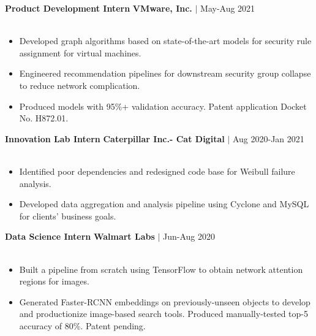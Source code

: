 \documentclass{cv}
\newcommand*{\labelfont}{\fontfamily{bch}\selectfont}
\begin{document}
{\labelfont \textbf{Product Development Intern} \hspace*{8.5cm} \textbf{VMware, Inc.} $|$ May-Aug 2021}\\
\vspace*{-25pt}\\
{
\small
\begin{itemize}
    \setlength\itemsep{-2.5pt}
    \item Developed graph algorithms based on state-of-the-art models for security rule assignment for virtual machines.
    \item Engineered recommendation pipelines for downstream security group collapse to reduce network complication.
    \item Produced models with 95\%+ validation accuracy. Patent application Docket No. H872.01.
\end{itemize}
}

{\labelfont \textbf{Innovation Lab Intern} \hspace*{6.5cm} \textbf{Caterpillar Inc.- Cat Digital} $|$ Aug 2020-Jan 2021}\\
\vspace*{-25pt}\\
{
\small
\begin{itemize}
    \setlength\itemsep{-2.5pt}
    \item Identified poor dependencies and redesigned code base for Weibull failure analysis.
    \item Developed data aggregation and analysis pipeline using Cyclone and MySQL for clients' business goals.
\end{itemize}
}

{\labelfont \textbf{Data Science Intern} \hspace*{10.15cm} \textbf{Walmart Labs} $|$ Jun-Aug 2020}\\
\vspace*{-25pt}\\
{
\small
\begin{itemize}
\setlength\itemsep{-2.5pt}
    \item Built a pipeline from scratch using TensorFlow to obtain network attention regions for images.
    \item Generated Faster-RCNN embeddings on previously-unseen objects to develop and productionize image-based search tools. Produced manually-tested top-5 accuracy of 80\%. Patent pending.
\end{itemize}
}
\end{document}

